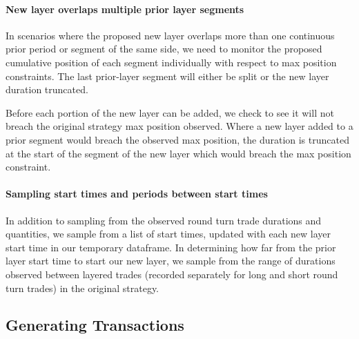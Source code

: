 \hypertarget{new-layer-overlaps-multiple-prior-layer-segments}{%
\paragraph{New layer overlaps multiple prior layer
segments}\label{new-layer-overlaps-multiple-prior-layer-segments}}

In scenarios where the proposed new layer overlaps more than one
continuous prior period or segment of the same side, we need to monitor
the proposed cumulative position of each segment individually with
respect to max position constraints. The last prior-layer segment will
either be split or the new layer duration truncated.

Before each portion of the new layer can be added, we check to see it
will not breach the original strategy max position observed. Where a new
layer added to a prior segment would breach the observed max position,
the duration is truncated at the start of the segment of the new layer
which would breach the max position constraint.

\hypertarget{sampling-start-times-and-periods-between-start-times}{%
\paragraph{Sampling start times and periods between start
times}\label{sampling-start-times-and-periods-between-start-times}}

In addition to sampling from the observed round turn trade durations and
quantities, we sample from a list of start times, updated with each new
layer start time in our temporary dataframe. In determining how far from
the prior layer start time to start our new layer, we sample from the
range of durations observed between layered trades (recorded separately
for long and short round turn trades) in the original strategy.

\hypertarget{generating-transactions}{%
\subsection{Generating Transactions}\label{generating-transactions}}

